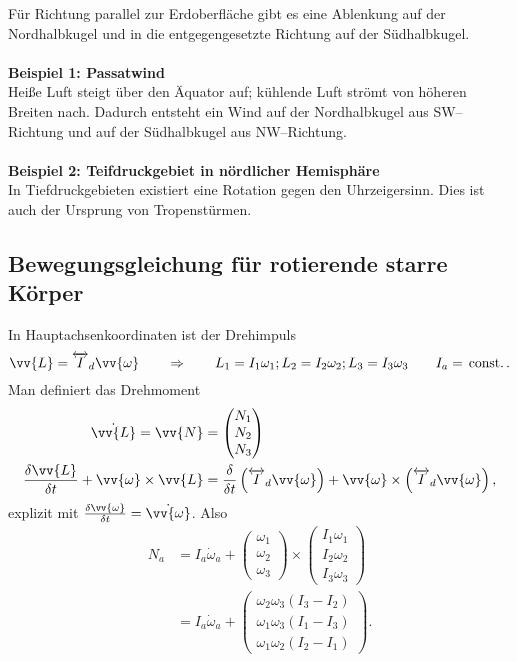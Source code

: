 \documentclass[a4paper,12pt]{article}
\numberwithin{equation}{section}
\begin{document}
Für Richtung parallel zur Erdoberfläche gibt es eine Ablenkung auf der Nordhalbkugel und in die entgegengesetzte Richtung auf der Südhalbkugel.
\\\hfill\\\textbf{Beispiel 1: Passatwind}\\ 
Heiße Luft steigt über den Äquator auf; kühlende Luft strömt von höheren Breiten nach. Dadurch entsteht ein Wind auf der Nordhalbkugel aus SW--Richtung und auf der Südhalbkugel aus NW--Richtung.
\\\hfill\\\textbf{Beispiel 2: Teifdruckgebiet in nördlicher Hemisphäre}\\ 
In Tiefdruckgebieten existiert eine Rotation gegen den Uhrzeigersinn. Dies ist auch der Ursprung von Tropenstürmen.

\subsection{Bewegungsgleichung für rotierende starre Körper}
In Hauptachsenkoordinaten ist der Drehimpuls
\[ 
        \vv{L}=\overleftrightarrow{I}_d\vv{\omega }\qquad \Rightarrow \qquad L_1=I_1\omega _1;L_2=I_2\omega _2;L_3=I_3\omega _3\qquad I_a=\,\text{const.}\,
.\] 
Man definiert das Drehmoment
\begin{align*}
        \dot{\vv{L}}=\vv{N}&=\begin{pmatrix}
        N_1\\N_2\\N_3
        \end{pmatrix}\\
                \dfrac{\delta \vv{L}}{\delta t}+\vv{\omega }\times \vv{L}&=\dfrac{\delta }{\delta t}\left(\overleftrightarrow{I}_d\vv{\omega }\right)+\vv{\omega }\times \left(\overleftrightarrow{I}_d\vv{\omega }\right)
,\end{align*}
explizit mit $\tfrac{\delta \vv{\omega }}{\delta t}=\dot{\vv{\omega }}$. Also
\begin{align*}
        N_a&=I_a\dot{\omega }_a+\begin{pmatrix}
                \omega _1\\\omega _2\\\omega _3
        \end{pmatrix}\times \begin{pmatrix}
                I_1\omega _1\\I_2\omega _2\\I_3\omega _3
        \end{pmatrix}\\
           &=I_a\dot{\omega }_a+\begin{pmatrix}
                   \omega _2\omega _3\left(I_3-I_2\right)\\
                   \omega _1\omega _3\left(I_1-I_3\right)\\
                   \omega _1\omega _2\left(I_2-I_1\right)
           \end{pmatrix}
.\end{align*}
\end{document}

